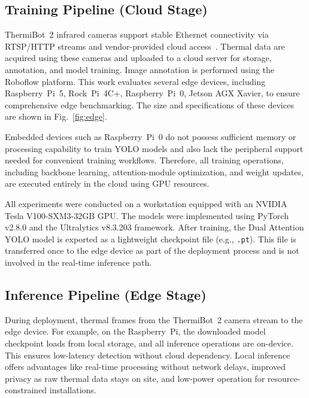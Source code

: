 \documentclass[journal,twoside,web]{ieeecolor}
\begin{document}
\subsection{Training Pipeline (Cloud Stage)}
ThermiBot~2 infrared cameras support stable Ethernet connectivity via RTSP/HTTP streams and vendor-provided cloud access~\cite{flir_thermibot2}. Thermal data are acquired using these cameras and uploaded to a cloud server for storage, annotation, and model training. Image annotation is performed using the Roboflow platform. This work evaluates several edge devices, including Raspberry~Pi~5, Rock~Pi~4C+, Raspberry~Pi~0, Jetson AGX Xavier, to ensure comprehensive edge benchmarking. The size and specifications of these devices are shown in Fig.~\ref{fig:edge}.

Embedded devices such as Raspberry~Pi~0 do not possess sufficient memory or processing capability to train YOLO models and also lack the peripheral support needed for convenient training workflows. Therefore, all training operations, including backbone learning, attention-module optimization, and weight updates, are executed entirely in the cloud using GPU resources.

All experiments were conducted on a workstation equipped with an NVIDIA Tesla V100-SXM3-32GB GPU. The models were implemented using PyTorch v2.8.0 and the Ultralytics v8.3.203 framework. After training, the Dual Attention YOLO model is exported as a lightweight checkpoint file (e.g., \texttt{.pt}). This file is transferred once to the edge device as part of the deployment process and is not involved in the real-time inference path.

\subsection{Inference Pipeline (Edge Stage)}
During deployment, thermal frames from the ThermiBot~2 camera stream to the edge device. For example, on the Raspberry~Pi, the downloaded model checkpoint loads from local storage, and all inference operations are on-device. This ensures low-latency detection without cloud dependency. Local inference offers advantages like real-time processing without network delays, improved privacy as raw thermal data stays on site, and low-power operation for resource-constrained installations.
\end{document}
